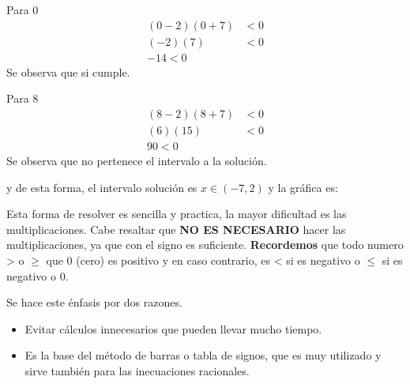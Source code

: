     Para 0
    \begin{align*}
        (0-2)(0+7) & < 0  		\\
        (-2)(7)   & < 0\\
        -14 < 0
    \end{align*}
    Se observa que si cumple.

    Para 8
    \begin{align*}
        (8-2)(8+7) & < 0  		\\
        (6)(15)   & < 0\\
        90 < 0
    \end{align*}
    Se observa que no pertenece el intervalo a la solución.

    y de esta forma, el intervalo solución es $x\in(-7,2)$ y la gráfica es:

    \vspace*{1cm}

    Esta forma de resolver es sencilla y practica, la mayor dificultad es las
    multiplicaciones. Cabe resaltar que \textbf{NO ES NECESARIO} hacer las
    multiplicaciones, ya que con el signo es suficiente. \textbf{Recordemos} que
    todo numero > o $\geq$ que 0 (cero) es positivo y en caso contrario, es
    < si es negativo o $ \leq $  si es negativo o 0.

    Se hace este énfasis por dos razones.

    \begin{itemize}
        \item Evitar cálculos innecesarios que pueden llevar mucho tiempo.
        \item Es la base del método de barras o tabla de signos, que es muy
            utilizado y sirve también para las inecuaciones racionales.
    \end{itemize}

